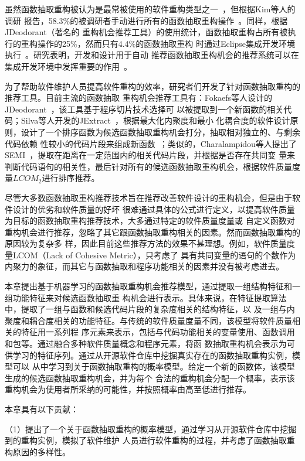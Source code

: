 虽然函数抽取重构被认为是最常被使用的软件重构类型之一~\cite{Murphy-Hill:ICSE09}，但根据Kim等人的调研
报告，58.3\%的被调研者手动进行所有的函数抽取重构操作~\cite{Kim:FSE12}。同样，根据JDeodorant（著名的
重构机会推荐工具）的使用统计，函数抽取重构占所有被执行的重构操作的25\%，然而只有4.4\%的函数抽取重构
时通过Eclipse集成开发环境执行~\cite{Negara:ECOOP13,Murphy-Hill:ICSE09}。研究表明，开发和设计用于自动
推荐函数抽取重构机会的推荐系统可以在集成开发环境中发挥重要的作用~\cite{Tsantalis:2011}。

为了帮助软件维护人员提高软件重构的效率，研究者们开发了针对函数抽取重构的推荐工具。目前主流的函数抽取
重构机会推荐工具有：Fokaefs等人设计的JDeodorant~\cite{fokaefs:icse11}，该工具基于程序切片技术选择可
以被提取到一个新函数的相关代码；Silva等人开发的JExtract~\cite{silva:CoRR15}，根据最大化内聚度和最小
化耦合度的软件设计原则，设计了一个排序函数为候选函数抽取重构机会打分，抽取相对独立的、与剩余代码依赖
性较小的代码片段来组成新函数~\cite{silva:ICPC14}；类似的，Charalampidou等人提出了
SEMI~\cite{charalampidou2016identifying}，提取在距离在一定范围内的相关代码片段，并根据是否存在共同变
量来判断代码语句的相关性，最后针对所有的候选函数抽取重构机会，根据软件质量度量$LCOM_2$进行排序推荐。

尽管大多数函数抽取重构推荐技术旨在推荐改善软件设计的重构机会，但是由于软件设计的优劣和软件质量的好坏
很难通过具体的公式进行定义，以提高软件质量为目标的函数抽取重构推荐技术，大多通过特定的软件质量度量或
自定义函数对重构机会进行推荐，忽略了其它跟函数抽取重构相关的因素。然而函数抽取重构的原因较为复杂多
样，因此目前这些推荐方法的效果不甚理想。例如，软件质量度量LCOM（Lack of Cohesive Metric），只考虑了
具有共同变量的语句的个数作为内聚力的象征，而其它与函数抽取和程序功能相关的因素并没有被考虑进去。

本章提出基于机器学习的函数抽取重构机会推荐模型，通过提取一组结构特征和一组功能特征来对候选函数抽取重
构机会进行表示。具体来说，在特征提取算法中，提取了一组与函数和候选代码片段的复杂度相关的结构特征，以
及一组与内聚度和耦合度相关的功能特征。与传统的软件质量度量不同，该模型将软件质量相关的特征用一系列程
序元素来表示，包括与代码功能相关的变量使用、函数调用和包等。通过融合多种软件质量概念和程序元素，将函
数抽取重构机会表示为可供学习的特征序列。通过从开源软件仓库中挖掘真实存在的函数抽取重构实例，模型可以
从中学习到关于函数抽取重构的概率模型。给定一个新的函数体，该模型生成的候选函数抽取重构机会，并为每个
合法的重构机会分配一个概率，表示该重构机会为使用者所采纳的可能性，并按照概率由高至低进行推荐。

本章具有以下贡献：

（1）提出了一个关于函数抽取重构的概率模型，通过学习从开源软件仓库中挖掘到的重构实例，模拟了软件维护
人员进行软件重构的过程，并考虑了函数抽取重构原因的多样性。


